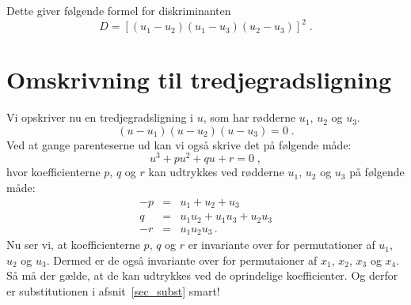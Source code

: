 \documentclass[12pt,oneside,a4paper]{article}
\newcommand{\bea}{\begin{eqnarray}}
\newcommand{\eea}{\end{eqnarray}}
\begin{document}
Dette giver følgende formel for diskriminanten
\begin{equation}
    D = \left[(u_1-u_2)(u_1-u_3)(u_2-u_3)\right]^2 \;.
    \label{eq_dis3}
\end{equation}


\section{Omskrivning til tredjegradsligning} \label{sec_omskriv}
Vi opskriver nu en tredjegradsligning i $u$, som har rødderne $u_1$, $u_2$ og 
$u_3$.
\begin{equation}
    (u-u_1)(u-u_2)(u-u_3)=0 \;.
    \label{tredje_1}
\end{equation}
Ved at gange parenteserne ud kan vi også skrive det på følgende måde:
\begin{equation}
    u^3 + pu^2+ qu + r = 0 \;,
    \label{tredje_2}
\end{equation}
hvor koefficienterne $p$, $q$ og $r$ kan udtrykkes ved rødderne $u_1$, $u_2$ og $u_3$ på følgende måde:
\bea
-p &=& u_1 + u_2 + u_3 \\
 q &=& u_1u_2 + u_1u_3 + u_2u_3 \\
-r &=& u_1u_2u_3 \,.
\eea
Nu ser vi, at koefficienterne $p$, $q$ og $r$ er invariante over for
permutationer af $u_1$, $u_2$ og $u_3$. Dermed er de også invariante over for
permutaioner af $x_1$, $x_2$, $x_3$ og $x_4$.  Så må der gælde, at de kan
udtrykkes ved de oprindelige koefficienter. Og derfor er substitutionen i
afsnit~\ref{sec_subst} smart!
\end{document}
